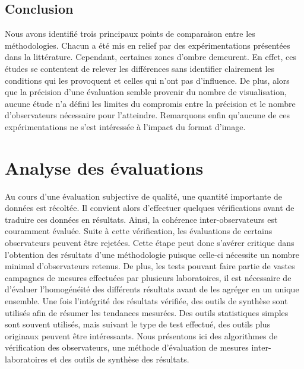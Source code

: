 \subsection{Conclusion}
Nous avons identifié trois principaux points de comparaison entre les méthodologies. Chacun a été mis en relief par des expérimentations présentées dans la littérature.
%
Cependant, certaines zones d'ombre demeurent. En effet, ces études se contentent de relever les différences sans identifier clairement les conditions qui les provoquent et celles qui n'ont pas d'influence. De plus, alors que la précision d'une évaluation semble provenir du nombre de visualisation, aucune étude n'a défini les limites du compromis entre la précision et le nombre d'observateurs nécessaire pour l'atteindre. Remarquons enfin qu'aucune de ces expérimentations ne s'est intéressée à l'impact du format d'image.


\section{Analyse des évaluations}
Au cours d'une évaluation subjective de qualité, une quantité importante de données est récoltée. Il convient alors d'effectuer quelques vérifications avant de traduire ces données en résultats. Ainsi, la cohérence inter-observateurs est couramment évaluée. Suite à cette vérification, les évaluations de certains observateurs peuvent être rejetées. Cette étape peut donc s'avérer critique dans l'obtention des résultats d'une méthodologie puisque celle-ci nécessite un nombre minimal d'observateurs retenus. De plus, les tests pouvant faire partie de vastes campagnes de mesures effectuées par plusieurs laboratoires, il est nécessaire de d'évaluer l'homogénéité des différents résultats avant de les agréger en un unique ensemble. Une fois l'intégrité des résultats vérifiée, des outils de synthèse sont utilisés afin de résumer les tendances mesurées. Des outils statistiques simples sont souvent utilisés, mais suivant le type de test effectué, des outils plus originaux peuvent être intéressants. Nous présentons ici des algorithmes de vérification des observateurs, une méthode d'évaluation de mesures inter-laboratoires et des outils de synthèse des résultats.


